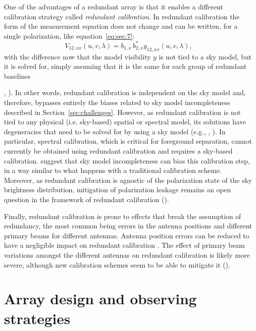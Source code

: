 One of the advantages of a redundant array is that it enables a different calibration strategy called {\it redundant calibration}. In redundant calibration the form of the measurement equation does not change and can be written, for a single polarization, like equation~\ref{eq:sec:7}:
\begin{equation}
V_{12,xx} (u,v,\lambda) = b_{1,x} \, b_{2,x}^* y_{12,xx} (u,v,\lambda),
\label{eq:sec:13}
\end{equation}
with the difference now that the model visibility $y$ is not tied to a sky model, but it is solved for, simply assuming that it is the same for each group of redundant baselines {\cite{wieringa92}, \cite{liu10}). In other words, redundant calibration is independent on the sky model and, therefore, bypasses entirely the biases related to sky model incompleteness described in Section~\ref{sec:challenges}. However, as redundant calibration is not tied to any physical (i.e. sky-based) spatial or spectral model, its solutions have degeneracies that need to be solved for by using a sky model (e.g., \cite{zheng14}, \cite{byrne19}). In particular, spectral calibration, which is critical for foreground separation, cannot currently be obtained using redundant calibration and requires a sky-based calibration. \cite{byrne19} suggest that sky model incompleteness can bias this calibration step, in a way similar to what happens with a traditional calibration scheme. Moreover, as redundant calibration is agnostic of the polarization state of the sky brightness distribution, mitigation of polarization leakage remains an open question in the framework of redundant calibration (\cite{dillon18}). 

Finally, redundant calibration is prone to effects that break the assumption of redundancy, the most common being errors in the antenna positions and different primary beams for different antennas. Antenna position errors can be reduced to have a negligible impact on redundant calibration \cite{joseph18}. The effect of primary beam variations amongst the different antennas on redundant calibration is likely more severe, although new calibration schemes seem to be able to mitigate it (\cite{orosz19}).



\section{Array design and observing strategies}
\label{sec:design}

}
